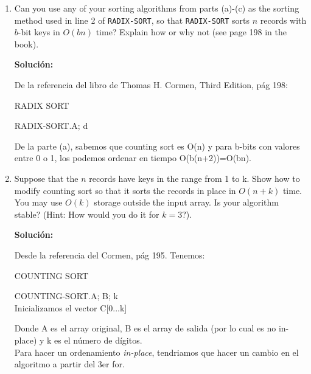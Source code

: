 \documentclass{article}
\begin{document}
\begin{enumerate}[label=(\alph*)]
  \item Can you use any of your sorting algorithms from parts (a)-(c) as the sorting method used in line 2 of \texttt{RADIX-SORT}, so that \texttt{RADIX-SORT} sorts $n$ records with $b$-bit keys in $O(bn)$ time? Explain how or why not (see page 198 in the book).
  
  \textbf{Solución:}
  
  De la referencia del libro de Thomas H. Cormen, Third Edition, pág 198:\\
  
  \begin{algorithm}[H]
   \caption{RADIX SORT}
   RADIX-SORT.A; d
  \end{algorithm}
  
  De la parte (a), sabemos que counting sort es O(n) y para b-bits con valores entre 0 o 1, los podemos ordenar en tiempo O(b(n+2))=O(bn).
  
  \item Suppose that the $n$ records have keys in the range from 1 to k. Show how to modify counting sort so that it sorts the records in place in $O(n+k)$ time. You may use $O(k)$ storage outside the input array. Is your algorithm stable? (Hint: How would you do it for $k=3$?).
  
  \textbf{Solución:}
  
  Desde la referencia del Cormen, pág 195. Tenemos:\\
  
  \begin{algorithm}[H]
   \caption{COUNTING SORT}
   COUNTING-SORT.A; B; k\\
   Inicializamos el vector C[0...k]\\
  \end{algorithm}  
  
  Donde A es el array original, B es el array de salida (por lo cual es no in-place) y k es el número de dígitos.\\  
  Para hacer un ordenamiento \textit{in-place}, tendriamos que hacer un cambio en el algoritmo a partir del 3er for.\\
  

\end{enumerate}
\end{document}
